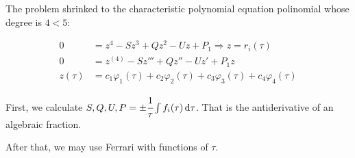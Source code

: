 \documentclass[12pt]{article}
\begin{document}
The problem shrinked to the characteristic polynomial equation polinomial whose degree is $4 < 5$:

\begin{align}
0 &= z^4 - S z^3 + Q z^2 - U z + P_1 \Rightarrow z = r_i(\tau) \\
0 &= z^{(4)} - S z''' + Q z'' - U z' + P_1 z \\
z(\tau) &= c_1 \varphi_1(\tau) + c_2 \varphi_2(\tau) + c_3 \varphi_3(\tau) + c_4 \varphi_4(\tau)
\end{align}

First, we calculate $S, Q, U, P = \pm \cfrac{1}{\tau}\int f_i(\tau)\,\mathrm{d}\tau$. That is the antiderivative of an algebraic fraction.

\vspace{3mm}

After that, we may use Ferrari with functions of $\tau$.
\end{document}
